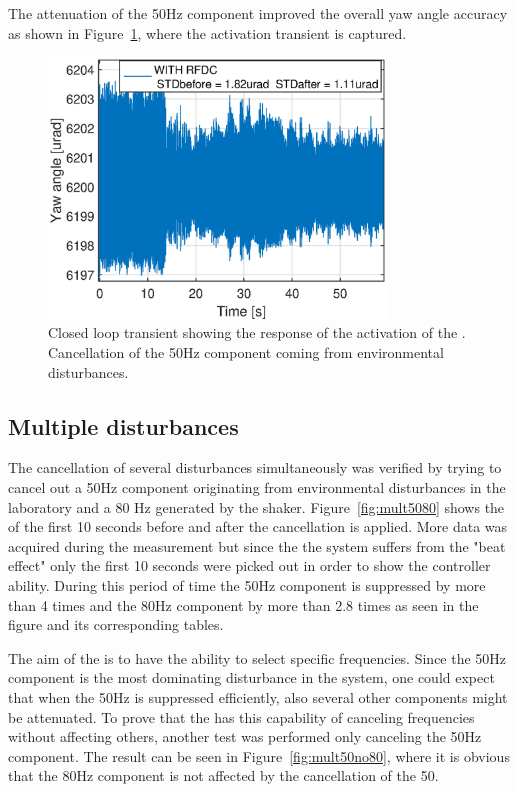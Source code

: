 The attenuation of the 50Hz component improved the overall yaw angle accuracy as shown in Figure~\ref{fig:transient_closedloop_50}, where the activation transient is captured.

\begin{figure}[h]
  \centering %
  \includegraphics[width=0.8\textwidth]{fig/matlab/transient_closedloop_50Hz}
  \caption{\label{fig:transient_closedloop_50}Closed loop transient showing the response of the activation of the \abbrRFDC. Cancellation of the 50Hz component coming from environmental disturbances.}
\end{figure}

\FloatBarrier
\subsection{Multiple disturbances}
The cancellation of several disturbances simultaneously was verified by trying to cancel out a 50Hz component originating from environmental disturbances in the laboratory and a 80 Hz generated by the shaker. Figure~\ref{fig:mult5080} shows the \abbrFFT of the first 10 seconds before and after the cancellation is applied. More data was acquired during the measurement but since the the system suffers from the "beat effect" only the first 10 seconds were picked out in order to show the controller ability. During this period of time the 50Hz component is suppressed by more than 4 times and the 80Hz component by more than 2.8 times as seen in the figure and its corresponding tables.

The aim of the \abbrRFDC is to have the ability to select specific frequencies. Since the 50Hz component is the most dominating disturbance in the system, one could expect that when the 50Hz is suppressed efficiently, also several other components might be attenuated. To prove that the \abbrRFDC has this capability of canceling frequencies without affecting others, another test was performed only canceling the 50Hz component. The result can be seen in Figure~\ref{fig:mult50no80}, where it is obvious that the 80Hz component is not affected by the cancellation of the 50.

